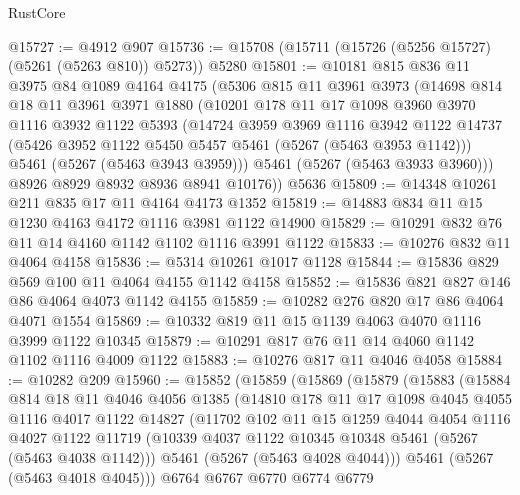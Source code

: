 \begin{lexlean}{RustCore}
\begin{coremodule}
@15727 := @4912 @907
@15736 := @15708 (@15711 (@15726 (@5256 @15727) (@5261 (@5263 @810)) @5273)) @5280
@15801 := @10181
    @815
    @836
    @11
    @3975
    @84
    @1089
    @4164
    @4175
    (@5306
      @815
      @11
      @3961
      @3973
      (@14698
        @814
        @18
        @11
        @3961
        @3971
        @1880
        (@10201
          @178
          @11
          @17
          @1098
          @3960
          @3970
          @1116
          @3932
          @1122
          @5393
          (@14724
            @3959
            @3969
            @1116
            @3942
            @1122
            @14737
            (@5426 @3952 @1122 @5450 @5457 @5461 (@5267 (@5463 @3953 @1142)))
            @5461
            (@5267 (@5463 @3943 @3959)))
          @5461
          (@5267 (@5463 @3933 @3960)))
        @8926
        @8929
        @8932
        @8936
        @8941
        @10176))
    @5636
@15809 := @14348 @10261 @211 @835 @17 @11 @4164 @4173 @1352
@15819 := @14883 @834 @11 @15 @1230 @4163 @4172 @1116 @3981 @1122 @14900
@15829 := @10291 @832 @76 @11 @14 @4160 @1142 @1102 @1116 @3991 @1122
@15833 := @10276 @832 @11 @4064 @4158
@15836 := @5314 @10261 @1017 @1128
@15844 := @15836 @829 @569 @100 @11 @4064 @4155 @1142 @4158
@15852 := @15836 @821 @827 @146 @86 @4064 @4073 @1142 @4155
@15859 := @10282 @276 @820 @17 @86 @4064 @4071 @1554
@15869 := @10332 @819 @11 @15 @1139 @4063 @4070 @1116 @3999 @1122 @10345
@15879 := @10291 @817 @76 @11 @14 @4060 @1142 @1102 @1116 @4009 @1122
@15883 := @10276 @817 @11 @4046 @4058
@15884 := @10282 @209
@15960 := @15852
    (@15859
      (@15869
        (@15879
          (@15883
            (@15884
              @814
              @18
              @11
              @4046
              @4056
              @1385
              (@14810
                @178
                @11
                @17
                @1098
                @4045
                @4055
                @1116
                @4017
                @1122
                @14827
                (@11702
                  @102
                  @11
                  @15
                  @1259
                  @4044
                  @4054
                  @1116
                  @4027
                  @1122
                  @11719
                  (@10339 @4037 @1122 @10345 @10348 @5461 (@5267 (@5463 @4038 @1142)))
                  @5461
                  (@5267 (@5463 @4028 @4044)))
                @5461
                (@5267 (@5463 @4018 @4045)))
              @6764
              @6767
              @6770
              @6774
              @6779

\end{coremodule}
\end{lexlean}
